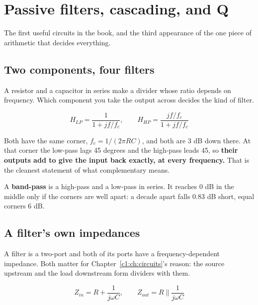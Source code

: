 
\section{Passive filters, cascading, and Q}
\label{c3:app:a}

The first useful circuits in the book, and the third appearance of the one piece of arithmetic that decides everything.

\subsection{Two components, four filters}
\label{c3:sec:a1}
A resistor and a capacitor in series make a divider whose ratio depends on frequency. Which component you take the output across decides the kind of filter.

\[
  H_{LP} = \frac{1}{1 + j f/f_c}, \qquad H_{HP} = \frac{j f/f_c}{1 + j f/f_c}
\]

Both have the same corner, $f_c = 1/(2\pi RC)$, and both are 3 dB down there. At that corner the low-pass lags 45 degrees and the high-pass leads 45, so \textbf{their outputs add to give the input back exactly, at every frequency.} That is the cleanest statement of what complementary means.


A \textbf{band-pass} is a high-pass and a low-pass in series. It reaches 0 dB in the middle only if the corners are well apart: a decade apart falls 0.83 dB short, equal corners 6 dB.

\subsection{A filter's own impedances}
\label{c3:sec:a2}
A filter is a two-port and both of its ports have a frequency-dependent impedance. Both matter for Chapter~\ref{c1:ch:circuits}'s reason: the source upstream and the load downstream form dividers with them.

\[
  Z_{in} = R + \frac{1}{j\omega C}, \qquad Z_{out} = R \parallel \frac{1}{j\omega C}
\]

